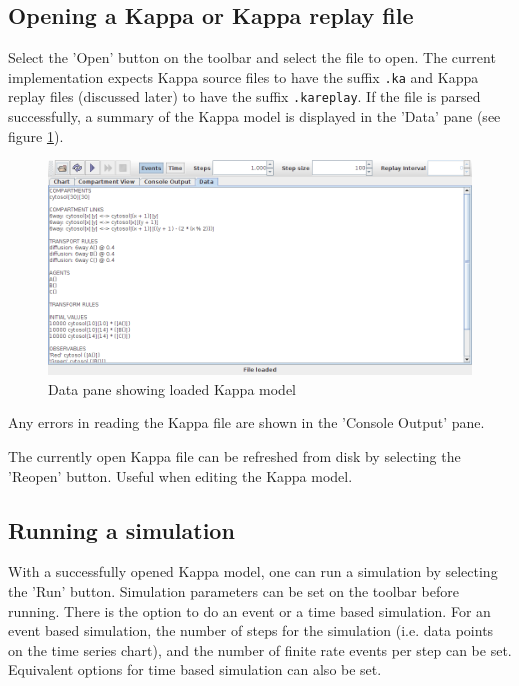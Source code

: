 \subsection{Opening a Kappa or Kappa replay file}

Select the 'Open' button on the toolbar and select the file to open. The current implementation expects Kappa source files to have the suffix \verb|.ka| and Kappa replay files (discussed later) to have the suffix \verb|.kareplay|. If the file is parsed successfully, a summary of the Kappa model is displayed in the 'Data' pane (see figure \ref{fig:dataPane}). 

\begin{figure}[h!]
 \centering
 \includegraphics[scale=0.3]{./images/FileOpenDataPane.png}
 \caption{Data pane showing loaded Kappa model}
 \label{fig:dataPane}
\end{figure}

Any errors in reading the Kappa file are shown in the 'Console Output' pane.

The currently open Kappa file can be refreshed from disk by selecting the 'Reopen' button. Useful when editing the Kappa model.

\subsection{Running a simulation}

With a successfully opened Kappa model, one can run a simulation by selecting the 'Run' button. Simulation parameters can be set on the toolbar before running. There is the option to do an event or a time based simulation. For an event based simulation, the number of steps for the simulation (i.e. data points on the time series chart), and the number of finite rate events per step can be set. Equivalent options for time based simulation can also be set.


